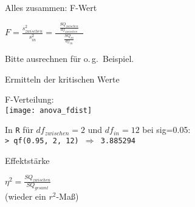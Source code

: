 \begin{frame}
  {Alles zusammen: F-Wert}
  \begin{center}
    $F=\frac{s^2_{zwischen}}{s^2_{in}}=\frac{\ \ \ \frac{SQ_{zwischen}}{df_{zwischen}}\ \ \ }{\frac{SQ_{in}}{df_{in}}}$\\
  \end{center}

  \vspace{0.5cm}
  \begin{center}
    Bitte ausrechnen für o.\,g.\ Beispiel.
  \end{center}
\end{frame}

\begin{frame}
  {Ermitteln der kritischen Werte}
  \begin{center}
    F-Verteilung:\\
    \texttt{[image: anova\_fdist]}
  \end{center}

  \vspace{0.5cm}
  In \texttt{R} für $df_{zwischen}=2$ und $df_{in}=12$ bei sig=0.05:\\
  \texttt{> qf(0.95, 2, 12) $\Rightarrow$ 3.885294}
\end{frame}

\begin{frame}
  {Effektstärke}

  \begin{center}
    \alert{$\eta^2=\frac{SQ_{zwischen}}{SQ_{gesamt}}$}\\[4ex]
    (wieder ein $r^2$-Maß)
  \end{center}
\end{frame}

